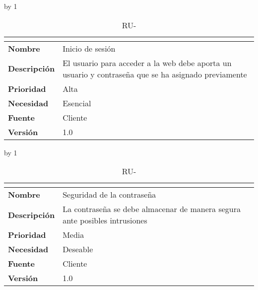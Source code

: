 \advance\ru by 1
\begin{table}[H]
	\caption{RU-\number\ru}
	\begin{tabular}{|l|p{}|}
		\hline
		\multicolumn{2}{|c|}{\cellcolor[HTML]{BFBFBF}{\color[HTML]{000000} \textbf{RU-\number\ru}}} \\ \hline
		\textbf{Nombre}      & Inicio de sesión                                                                                    \\ \hline
		\textbf{Descripción} & El usuario para acceder a la web debe aporta un usuario y contraseña que se ha asignado previamente \\ \hline
		\textbf{Prioridad}   & Alta                                                                                                \\ \hline
		\textbf{Necesidad}   & Esencial                                                                                            \\ \hline
		\textbf{Fuente}      & Cliente                                                                                             \\ \hline
		\textbf{Versión}     & 1.0                                                                                                 \\ \hline
	\end{tabular}
\end{table}
\advance\ru by 1
\begin{table}[H]
	\caption{RU-\number\ru}
	\begin{tabular}{|l|p{}|}
		\hline
		\multicolumn{2}{|c|}{\cellcolor[HTML]{BFBFBF}{\color[HTML]{000000} \textbf{RU-\number\ru}}} \\ \hline
		\textbf{Nombre}      & Seguridad de la contraseña                                                 \\ \hline
		\textbf{Descripción} & La contraseña se debe almacenar de manera segura ante posibles intrusiones \\ \hline
		\textbf{Prioridad}   & Media                                                                      \\ \hline
		\textbf{Necesidad}   & Deseable                                                                   \\ \hline
		\textbf{Fuente}      & Cliente                                                                    \\ \hline
		\textbf{Versión}     & 1.0                                                                        \\ \hline
	\end{tabular}
\end{table}
